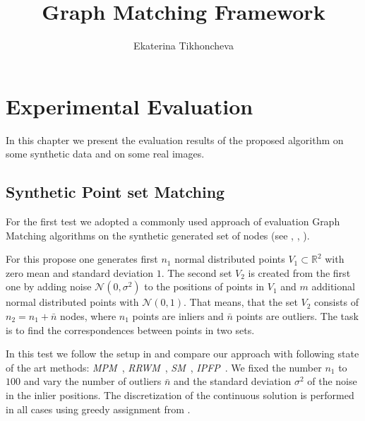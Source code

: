 \documentclass[
	fontsize=12pt,
	paper=a4,
	twoside=false,
	numbers=noenddot,
	plainheadsepline,
	toc=listof,
	toc=bibliography
]{scrartcl}
\begin{document}
\pagestyle{plain}

\title{Graph Matching Framework}
\author{Ekaterina Tikhoncheva}
\date{} 

\maketitle 



\section{Experimental Evaluation}

In this chapter we present the evaluation results of the proposed algorithm on some synthetic data and on some real images.

\subsection{Synthetic Point set Matching}

For the first test we adopted a commonly used approach of evaluation Graph Matching algorithms on the synthetic generated set of nodes (see \cite{Cho2014_Haystack}, \cite{Cho2010_RRWM}, \cite{Leordeanu2009_IPFP}). 

For this propose one generates first $n_1$ normal distributed points $V_1\subset\mathbb{R}^2$ with zero mean and standard deviation $1$. The second set $V_2$ is created from the first one by adding noise $\mathcal{N}(0,\sigma^2)$ to the positions of points in $V_1$ and $m$ additional normal distributed points with $\mathcal{N}(0,1)$.  That means, that the set $V_2$ consists of $n_2=n_1+\bar{n}$ nodes, where $n_1$ points are inliers and $\bar{n}$ points are outliers. The task is to find the correspondences between points in two sets.

In this test we follow the setup in \cite{Cho2014_Haystack} and compare our approach with following state of the art methods: \emph{MPM}~\cite{Cho2014_Haystack}, \emph{RRWM}~\cite{Cho2010_RRWM}, \emph{SM}~\cite{Leordeanu2005}, \emph{IPFP}~\cite{Leordeanu2009_IPFP}. We fixed the number $n_1$ to $100$ and vary the number of outliers $\bar{n}$ and the standard deviation $\sigma^2$ of the noise in the inlier positions. The discretization of the continuous solution is performed in all cases using greedy assignment from \cite{Leordeanu2005}.
\end{document}
